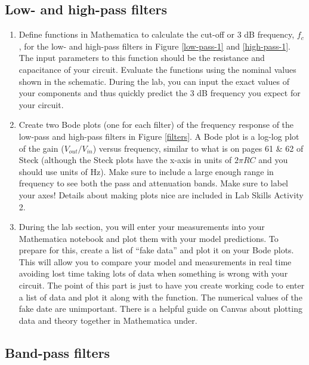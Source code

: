 \documentclass[10pt]{PhysLab1C} %
\begin{document}
\subsection{Low- and high-pass filters}


\begin{enumerate}
\def\labelenumi{\arabic{enumi}.}
\item
  Define functions in Mathematica to calculate the cut-off or 3 dB
  frequency, \(f_c\), for the low- and high-pass filters in Figure \ref{low-pass-1} and \ref{high-pass-1}. The input parameters to this function should 
  be the resistance and capacitance of your circuit. Evaluate the
  functions using the nominal 
  values shown in the schematic. During the lab, you can input the exact
  values of your 
  components and thus quickly predict the 3 dB frequency you expect for
  your circuit.
\item
  Create two Bode plots (one for each filter) of the frequency response
  of the low-pass and
  high-pass filters in Figure \ref{filters}. A Bode plot is a log-log plot of the
  gain (\(V_{out}/V_{in}\)) versus
  frequency, similar to what is on pages 61 \& 62 of Steck (although the
  Steck plots have the
  x-axis in units of \(2\pi RC\) and you should use units of Hz). Make
  sure to include a large
  enough range in frequency to see both the pass and attenuation bands.
  Make sure to label
  your axes! Details about making plots nice are included in Lab Skills
  Activity 2.
\item
  During the lab section, you will enter your measurements into your
  Mathematica
  notebook and plot them with your model predictions. To prepare for
  this, create a list of
  ``fake data'' and plot it on your Bode plots. This will allow you to
  compare your model and
  measurements in real time avoiding lost time taking lots of data when
  something is wrong
  with your circuit. The point of this part is just to have you create
  working code to enter a
  list of data and plot it along with the function. The numerical values
  of the fake date are
  unimportant. There is a helpful guide on Canvas about plotting data
  and theory together
  in Mathematica under.
\end{enumerate}


\subsection{Band-pass filters}
\end{document}

